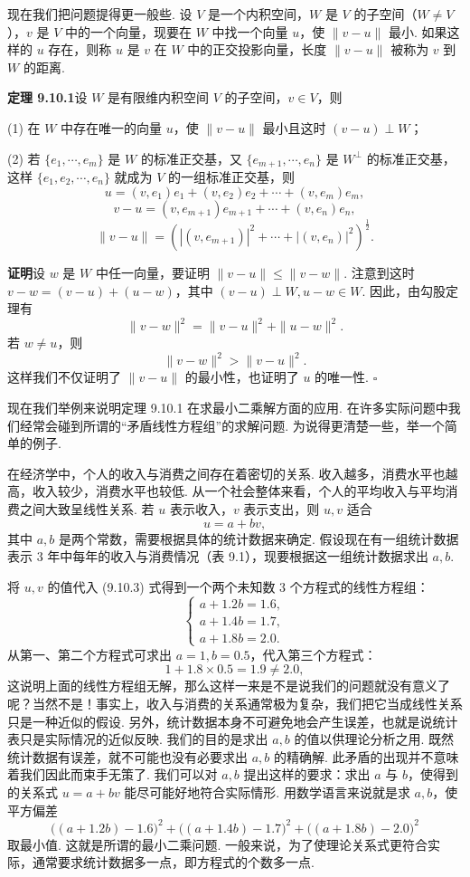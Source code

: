 \documentclass[UTF8, 12pt, fontset=fandol, oneside]{ctexart}
\begin{document}
现在我们把问题提得更一般些. 设 $V$ 是一个内积空间，$W$ 是 $V$ 的子空间（$W\ne V$），$v$ 是 $V$ 中的一个向量，现要在 $W$ 中找一个向量 $u$，使 $\|v-u\|$ 最小. 如果这样的 $u$ 存在，则称 $u$ 是 $v$ 在 $W$ 中的正交投影向量，长度 $\|v-u\|$ 被称为 $v$ 到 $W$ 的距离.

\noindent\textbf{定理 9.10.1}\quad 设 $W$ 是有限维内积空间 $V$ 的子空间，$v\in V$，则

(1) 在 $W$ 中存在唯一的向量 $u$，使 $\|v-u\|$ 最小且这时 $(v-u)\perp W$；

(2) 若 $\{e_1,\cdots,e_m\}$ 是 $W$ 的标准正交基，又 $\{e_{m+1},\cdots,e_n\}$ 是 $W^\perp$ 的标准正交基，这样 $\{e_1,e_2,\cdots,e_n\}$ 就成为 $V$ 的一组标准正交基，则
\[
  u=(v,e_1)e_1+(v,e_2)e_2+\cdots+(v,e_m)e_m,
\]
\[
  v-u=(v,e_{m+1})e_{m+1}+\cdots+(v,e_n)e_n,
\]
\begin{equation}
  \|v-u\|=\left(|(v,e_{m+1})|^2+\cdots+|(v,e_n)|^2\right)^{\frac12}.
  \tag{9.10.2}
\end{equation}

\noindent\textbf{证明}\quad 设 $w$ 是 $W$ 中任一向量，要证明 $\|v-u\|\le\|v-w\|$. 注意到这时 $v-w=(v-u)+(u-w)$，其中 $(v-u)\perp W,u-w\in W$. 因此，由勾股定理有
\[
  \|v-w\|^2=\|v-u\|^2+\|u-w\|^2.
\]
若 $w\ne u$，则
\[
  \|v-w\|^2>\|v-u\|^2.
\]
这样我们不仅证明了 $\|v-u\|$ 的最小性，也证明了 $u$ 的唯一性. $\square$

现在我们举例来说明定理 9.10.1 在求最小二乘解方面的应用. 在许多实际问题中我们经常会碰到所谓的“矛盾线性方程组”的求解问题. 为说得更清楚一些，举一个简单的例子.

在经济学中，个人的收入与消费之间存在着密切的关系. 收入越多，消费水平也越高，收入较少，消费水平也较低. 从一个社会整体来看，个人的平均收入与平均消费之间大致呈线性关系. 若 $u$ 表示收入，$v$ 表示支出，则 $u,v$ 适合
\begin{equation}
  u=a+bv,
  \tag{9.10.3}
\end{equation}
其中 $a,b$ 是两个常数，需要根据具体的统计数据来确定. 假设现在有一组统计数据表示 $3$ 年中每年的收入与消费情况（表 9.1），现要根据这一组统计数据求出 $a,b$.

将 $u,v$ 的值代入 (9.10.3) 式得到一个两个未知数 $3$ 个方程式的线性方程组：
\[
  \begin{cases}
    a+1.2b=1.6,\\
    a+1.4b=1.7,\\
    a+1.8b=2.0.
  \end{cases}
\]
从第一、第二个方程式可求出 $a=1,b=0.5$，代入第三个方程式：
\[
  1+1.8\times0.5=1.9\ne2.0,
\]
这说明上面的线性方程组无解，那么这样一来是不是说我们的问题就没有意义了呢？当然不是！事实上，收入与消费的关系通常极为复杂，我们把它当成线性关系只是一种近似的假设. 另外，统计数据本身不可避免地会产生误差，也就是说统计表只是实际情况的近似反映. 我们的目的是求出 $a,b$ 的值以供理论分析之用. 既然统计数据有误差，就不可能也没有必要求出 $a,b$ 的精确解. 此矛盾的出现并不意味着我们因此而束手无策了. 我们可以对 $a,b$ 提出这样的要求：求出 $a$ 与 $b$，使得到的关系式 $u=a+bv$ 能尽可能好地符合实际情形. 用数学语言来说就是求 $a,b$，使平方偏差
\[
  \big((a+1.2b)-1.6\big)^2+\big((a+1.4b)-1.7\big)^2+\big((a+1.8b)-2.0\big)^2
\]
取最小值. 这就是所谓的最小二乘问题. 一般来说，为了使理论关系式更符合实际，通常要求统计数据多一点，即方程式的个数多一点.
\end{document}
